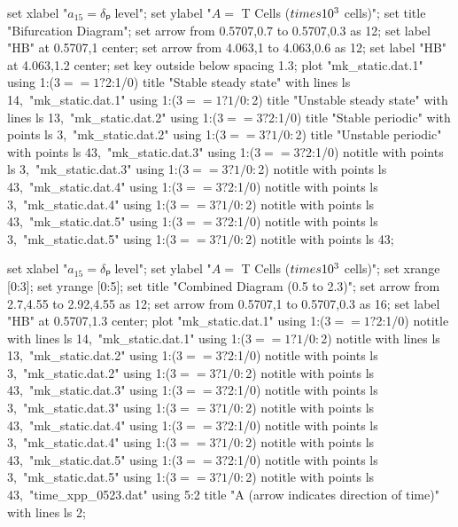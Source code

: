   set xlabel "$a_{15} = δₚ$ level";
  set ylabel "$A = $ T Cells ($\\times 10^3$ cells)";
  set title "Bifurcation Diagram";
  set arrow from 0.5707,0.7 to 0.5707,0.3 as 12;
  set label "HB" at 0.5707,1 center;
  set arrow from 4.063,1 to 4.063,0.6 as 12;
  set label "HB" at 4.063,1.2 center;
  set key outside below spacing 1.3;
  plot "mk_static.dat.1" using 1:($3==1?$2:1/0) title "Stable steady state" with lines ls 14,\
       "mk_static.dat.1" using 1:($3==1?1/0:$2) title "Unstable steady state" with lines ls 13,\
       "mk_static.dat.2" using 1:($3==3?$2:1/0) title "Stable periodic" with points ls 3,\
       "mk_static.dat.2" using 1:($3==3?1/0:$2) title "Unstable periodic" with points ls 43,\
       "mk_static.dat.3" using 1:($3==3?$2:1/0) notitle with points ls 3,\
       "mk_static.dat.3" using 1:($3==3?1/0:$2) notitle with points ls 43,\
       "mk_static.dat.4" using 1:($3==3?$2:1/0) notitle with points ls 3,\
       "mk_static.dat.4" using 1:($3==3?1/0:$2) notitle with points ls 43,\
       "mk_static.dat.5" using 1:($3==3?$2:1/0) notitle with points ls 3,\
       "mk_static.dat.5" using 1:($3==3?1/0:$2) notitle with points ls 43;
\stopGNUPLOTscript

\startGNUPLOTscript[bifurcation_combined_0523]
  set xlabel "$a_{15} = δₚ$ level";
  set ylabel "$A = $ T Cells ($\\times 10^3$ cells)";
  set xrange [0:3];
  set yrange [0:5];
  set title "Combined Diagram (0.5 to 2.3)";
  set arrow from 2.7,4.55 to 2.92,4.55 as 12;
  set arrow from 0.5707,1 to 0.5707,0.3 as 16;
  set label "HB" at 0.5707,1.3 center;
  plot "mk_static.dat.1" using 1:($3==1?$2:1/0) notitle with lines ls 14,\
       "mk_static.dat.1" using 1:($3==1?1/0:$2) notitle with lines ls 13,\
       "mk_static.dat.2" using 1:($3==3?$2:1/0) notitle with points ls 3,\
       "mk_static.dat.2" using 1:($3==3?1/0:$2) notitle with points ls 43,\
       "mk_static.dat.3" using 1:($3==3?$2:1/0) notitle with points ls 3,\
       "mk_static.dat.3" using 1:($3==3?1/0:$2) notitle with points ls 43,\
       "mk_static.dat.4" using 1:($3==3?$2:1/0) notitle with points ls 3,\
       "mk_static.dat.4" using 1:($3==3?1/0:$2) notitle with points ls 43,\
       "mk_static.dat.5" using 1:($3==3?$2:1/0) notitle with points ls 3,\
       "mk_static.dat.5" using 1:($3==3?1/0:$2) notitle with points ls 43,\
       "time_xpp_0523.dat" using 5:2 title "A (arrow indicates direction of time)" with lines ls 2;
\stopGNUPLOTscript


